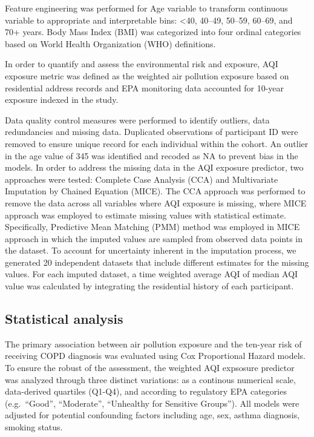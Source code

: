 \documentclass[
]{article}
\begin{document}
Feature engineering was performed for Age variable to transform
continuous variable to appropriate and interpretable bins: \textless40,
40--49, 50--59, 60--69, and 70+ years. Body Mass Index (BMI) was
categorized into four ordinal categories based on World Health
Organization (WHO) definitions.

In order to quantify and assess the environmental risk and exposure, AQI
exposure metric was defined as the weighted air pollution exposure based
on residential address records and EPA monitoring data accounted for
10-year exposure indexed in the study.

Data quality control measures were performed to identify outliers, data
redundancies and missing data. Duplicated observations of participant ID
were removed to ensure unique record for each individual within the
cohort. An outlier in the age value of 345 was identified and recoded as
NA to prevent bias in the models. In order to address the missing data
in the AQI exposure predictor, two approaches were tested: Complete Case
Analysis (CCA) and Multivariate Imputation by Chained Equation (MICE).
The CCA approach was performed to remove the data across all variables
where AQI exposure is missing, where MICE approach was employed to
estimate missing values with statistical estimate. Specifically,
Predictive Mean Matching (PMM) method was employed in MICE approach in
which the imputed values are sampled from observed data points in the
dataset. To account for uncertainty inherent in the imputation process,
we generated 20 independent datasets that include different estimates
for the missing values. For each imputed dataset, a time weighted
average AQI of median AQI value was calculated by integrating the
residential history of each participant.

\subsection{Statistical analysis}\label{statistical-analysis}

The primary association between air pollution exposure and the ten-year
risk of receiving COPD diagnosis was evaluated using Cox Proportional
Hazard models. To ensure the robust of the assessment, the weighted AQI
expsosure predictor was analyzed through three distinct variations: as a
continous numerical scale, data-derived quartiles (Q1-Q4), and according
to regulatory EPA categories (e.g.~``Good'', ``Moderate'', ``Unhealthy
for Sensitive Groups''). All models were adjusted for potential
confounding factors including age, sex, asthma diagnosis, smoking
status.
\end{document}
